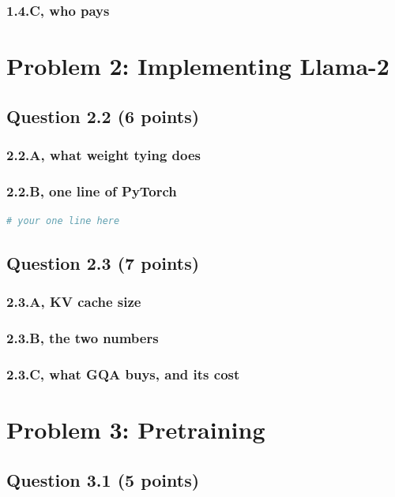 \documentclass[11pt]{article}
\begin{document}
\subsubsection*{1.4.C, who pays}

\section*{Problem 2: Implementing Llama-2}

\subsection*{Question 2.2 (6 points)}
\subsubsection*{2.2.A, what weight tying does}
\subsubsection*{2.2.B, one line of PyTorch}
\begin{lstlisting}[language=Python]
# your one line here
\end{lstlisting}

\subsection*{Question 2.3 (7 points)}
\subsubsection*{2.3.A, KV cache size}
\subsubsection*{2.3.B, the two numbers}
\subsubsection*{2.3.C, what GQA buys, and its cost}

\section*{Problem 3: Pretraining}

\subsection*{Question 3.1 (5 points)}
\end{document}
